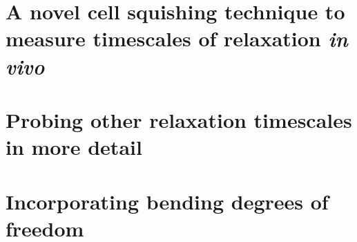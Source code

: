 \section{A novel cell squishing technique to measure timescales of relaxation \textit{in vivo}}

\section{Probing other relaxation timescales in more detail}

\section{Incorporating bending degrees of freedom}